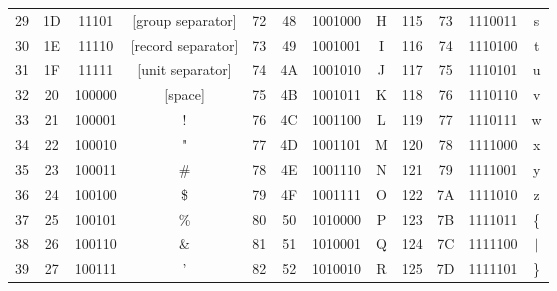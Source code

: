 {{\begin{tabular}{cccc|cccc|cccc}
{\color[HTML]{9400FF} 29} & 1D & {\color[HTML]{9400FF} 11101} & {[}group separator{]} & {\color[HTML]{9400FF} 72} & 48 & {\color[HTML]{9400FF} 1001000} & H & {\color[HTML]{9400FF} 115} & 73 & {\color[HTML]{9400FF} 1110011} & s \\
{\color[HTML]{9400FF} 30} & 1E & {\color[HTML]{9400FF} 11110} & {[}record separator{]} & {\color[HTML]{9400FF} 73} & 49 & {\color[HTML]{9400FF} 1001001} & I & {\color[HTML]{9400FF} 116} & 74 & {\color[HTML]{9400FF} 1110100} & t \\
{\color[HTML]{9400FF} 31} & 1F & {\color[HTML]{9400FF} 11111} & {[}unit separator{]} & {\color[HTML]{9400FF} 74} & 4A & {\color[HTML]{9400FF} 1001010} & J & {\color[HTML]{9400FF} 117} & 75 & {\color[HTML]{9400FF} 1110101} & u \\
{\color[HTML]{9400FF} 32} & 20 & {\color[HTML]{9400FF} 100000} & {[}space{]} & {\color[HTML]{9400FF} 75} & 4B & {\color[HTML]{9400FF} 1001011} & K & {\color[HTML]{9400FF} 118} & 76 & {\color[HTML]{9400FF} 1110110} & v \\
{\color[HTML]{9400FF} 33} & 21 & {\color[HTML]{9400FF} 100001} & ! & {\color[HTML]{9400FF} 76} & 4C & {\color[HTML]{9400FF} 1001100} & L & {\color[HTML]{9400FF} 119} & 77 & {\color[HTML]{9400FF} 1110111} & w \\
{\color[HTML]{9400FF} 34} & 22 & {\color[HTML]{9400FF} 100010} & " & {\color[HTML]{9400FF} 77} & 4D & {\color[HTML]{9400FF} 1001101} & M & {\color[HTML]{9400FF} 120} & 78 & {\color[HTML]{9400FF} 1111000} & x \\
{\color[HTML]{9400FF} 35} & 23 & {\color[HTML]{9400FF} 100011} & \# & {\color[HTML]{9400FF} 78} & 4E & {\color[HTML]{9400FF} 1001110} & N & {\color[HTML]{9400FF} 121} & 79 & {\color[HTML]{9400FF} 1111001} & y \\
{\color[HTML]{9400FF} 36} & 24 & {\color[HTML]{9400FF} 100100} & \$ & {\color[HTML]{9400FF} 79} & 4F & {\color[HTML]{9400FF} 1001111} & O & {\color[HTML]{9400FF} 122} & 7A & {\color[HTML]{9400FF} 1111010} & z \\
{\color[HTML]{9400FF} 37} & 25 & {\color[HTML]{9400FF} 100101} & \% & {\color[HTML]{9400FF} 80} & 50 & {\color[HTML]{9400FF} 1010000} & P & {\color[HTML]{9400FF} 123} & 7B & {\color[HTML]{9400FF} 1111011} & \{ \\
{\color[HTML]{9400FF} 38} & 26 & {\color[HTML]{9400FF} 100110} & \& & {\color[HTML]{9400FF} 81} & 51 & {\color[HTML]{9400FF} 1010001} & Q & {\color[HTML]{9400FF} 124} & 7C & {\color[HTML]{9400FF} 1111100} & $\vert$ \\
{\color[HTML]{9400FF} 39} & 27 & {\color[HTML]{9400FF} 100111} & ' & {\color[HTML]{9400FF} 82} & 52 & {\color[HTML]{9400FF} 1010010} & R & {\color[HTML]{9400FF} 125} & 7D & {\color[HTML]{9400FF} 1111101} & \} \\

\end{tabular}}}

